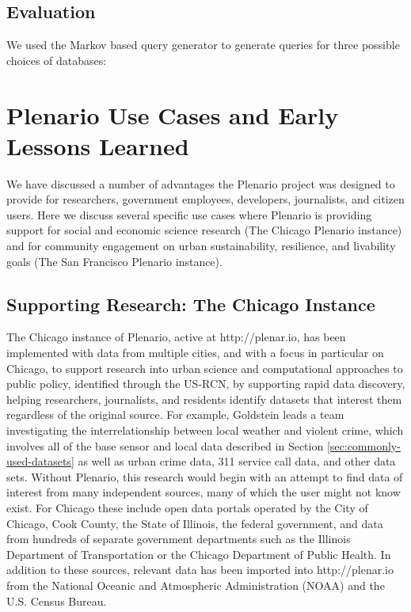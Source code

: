 \documentclass[11pt]{article}
\begin{document}
\subsection{Evaluation}
We used the Markov based query generator to generate queries for three possible choices of databases: 


\section{Plenario Use Cases and Early Lessons Learned}
We have discussed a number of advantages the Plenario project was designed to provide for researchers, government employees, developers, journalists, and citizen users. Here we discuss several specific use cases where Plenario is providing support for social and economic science research (The Chicago Plenario instance) and for community engagement on urban sustainability, resilience, and livability goals (The San Francisco Plenario instance). 

\subsection{\textbf{Supporting Research: The Chicago Instance}}\label{chicago-instance}
The Chicago instance of Plenario, active at http://plenar.io, has been implemented with data from multiple cities, and with a focus in particular on Chicago, to support research\textit{ }into urban science and computational approaches to public policy, identified through the US-RCN, by supporting rapid data discovery, helping researchers, journalists, and residents identify datasets that interest them regardless of the original source. For example, Goldstein leads a team investigating the interrelationship between local weather and violent crime, which involves all of the base sensor and local data described in Section \ref{sec:commonly-used-datasets} as well as urban crime data, 311 service call data, and other data sets. Without Plenario, this research would begin with an attempt to find data of interest from many independent sources, many of which the user might not know exist. For Chicago these include open data portals operated by the City of Chicago, Cook County, the State of Illinois, the federal government, and data from hundreds of separate government departments such as the Illinois Department of Transportation or the Chicago Department of Public Health. In addition to these sources, relevant data has been imported into http://plenar.io from the National Oceanic and Atmospheric Administration (NOAA) and the U.S. Census Bureau. 
\end{document}
